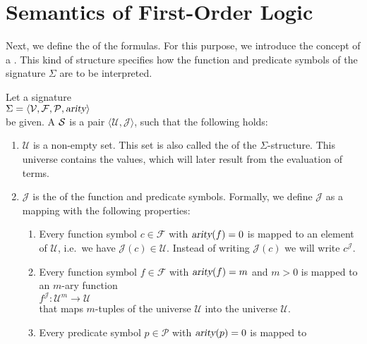 \section{Semantics of First-Order Logic \label{sec:semantik}}
Next, we define the  of the formulas. For this purpose, we introduce the concept of a
.  This kind of structure specifies how the
function and predicate symbols of the signature $\Sigma$ are to be interpreted.

\begin{Definition}[Structure]
    Let a signature \\[0.2cm]
    \hspace*{1.3cm} $\Sigma = \langle \mathcal{V}, \mathcal{F}, \mathcal{P}, \textsl{arity} \rangle$ \\[0.2cm]
    be given. A  $\mathcal{S}$ is a
    pair $\langle \mathcal{U}, \mathcal{J} \rangle$, such that the following holds:
    \begin{enumerate}
        \item $\mathcal{U}$ is a non-empty set. This set is also called the
                of the $\Sigma$-structure. This universe contains the values,
              which will later result from the evaluation of terms.
        \item $\mathcal{J}$ is the   of the function and predicate symbols.
              Formally, we define $\mathcal{J}$ as a mapping with the following properties:
        \begin{enumerate}
        \item Every function symbol $c \in \mathcal{F}$ with $\textsl{arity}(f) = 0$ is mapped to an element
              of $\mathcal{U}$, i.e.~we have $\mathcal{J}(c) \in \mathcal{U}$.  Instead of writing
              $\mathcal{J}(c)$ we will write $c^{\mathcal{J}}$.
        \item Every function symbol $f \in \mathcal{F}$ with $\textsl{arity}(f) = m$ and $m > 0$ is mapped to
              an $m$-ary function \\[0.2cm]
              \hspace*{1.3cm}
              $f^\mathcal{J}\colon \mathcal{U}^m \rightarrow \mathcal{U}$ \\[0.2cm]
              that maps $m$-tuples of the universe $\mathcal{U}$ into the universe $\mathcal{U}$.
        \item Every predicate symbol $p \in \mathcal{P}$ with $\textsl{arity}(p) = 0$ is mapped to

\end{enumerate}
\end{enumerate}
\end{Definition}
